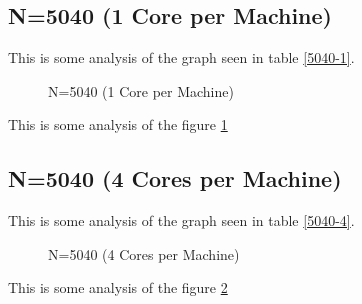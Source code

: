 \documentclass[a4paper]{article}
\begin{document}
\subsection{N=5040 (1 Core per Machine)}

This is some analysis of the graph seen in table \ref{5040-1}.

\begin{figure}
    
    \caption{N=5040 (1 Core per Machine)}
    \label{fig:5040_1}
\end{figure}

This is some analysis of the figure \ref{fig:5040_1}

\subsection{N=5040 (4 Cores per Machine)}

This is some analysis of the graph seen in table \ref{5040-4}.

\begin{figure}
    
    \caption{N=5040 (4 Cores per Machine)}
    \label{fig:5040_4}
\end{figure}

This is some analysis of the figure \ref{fig:5040_4}
\end{document}
